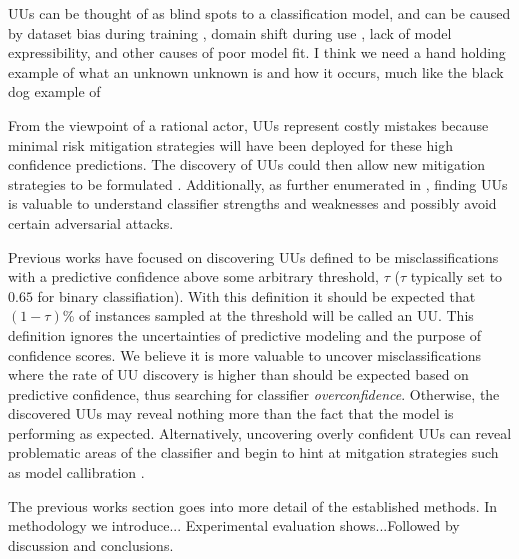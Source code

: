 \documentclass[letterpaper]{article} %
\newcommand{\wdb}[1]{{\color{blue} #1}} %
\begin{document}
UUs can be thought of as blind spots to a classification model, and can be caused by dataset bias during training \citep{stock2017convnets}, domain shift during use \citep{sugiyama2017dataset}, lack of model expressibility, and other causes of poor model fit. \wdb{I think we need a hand holding example of what an unknown unknown is and how it occurs, much like the black dog example of \citep{Lakkaraju2016}}  


From the viewpoint of a rational actor, UUs represent costly mistakes because minimal risk mitigation strategies will have been deployed for these high confidence predictions.  The discovery of UUs could then allow new mitigation strategies to be formulated \citep{Nushi2016a}. Additionally, as further enumerated in \citet{Bansal2018}, finding UUs is valuable to understand classifier strengths and weaknesses and possibly avoid certain adversarial attacks.


Previous works have focused on discovering UUs defined to be misclassifications with a predictive confidence above some arbitrary threshold, $\tau$ ($\tau$ typically set to $0.65$ for binary classifiation).  With this definition it should be expected that $(1-\tau)$\% of instances sampled at the threshold will be called an UU. This definition ignores the uncertainties of predictive modeling and the purpose of confidence scores.  We believe it is more valuable to uncover misclassifications where the rate of UU discovery is higher than should be expected based on predictive confidence, thus searching for classifier \textit{overconfidence}. Otherwise, the discovered UUs may reveal nothing more than the fact that the model is performing as expected.  Alternatively, uncovering overly confident UUs can reveal problematic areas of the classifier and begin to hint at mitgation strategies such as model callibration \citep{bella2010calibration}.  



\wdb{The previous works section goes into more detail of the established methods. In methodology we introduce... Experimental evaluation shows...Followed by discussion and conclusions.}
\end{document}
